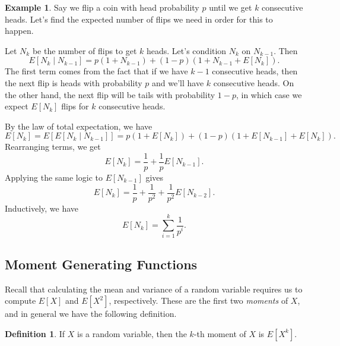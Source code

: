 \documentclass[12pt]{article}
\theoremstyle{plain}
\theoremstyle{definition}
\newtheorem{definition}[theorem]{Definition}
\newtheorem{example}[theorem]{Example}
\theoremstyle{remark}
\begin{document}
\begin{example}
    Say we flip a coin with head probability $p$ until we get $k$ consecutive heads.
    Let's find the expected number of flips we need in order for this to happen.

    Let $N_k$ be the number of flips to get $k$ heads.
    Let's condition $N_k$ on $N_{k-1}$.
    Then
    \[
        E[N_k \mid N_{k-1}] = p(1+N_{k-1}) + (1-p)(1 + N_{k-1} + E[N_k]).
    \]
    The first term comes from the fact that if we have $k-1$ consecutive heads, then the next flip is heads with probability $p$ and we'll have $k$ consecutive heads.
    On the other hand, the next flip will be tails with probability $1-p$, in which case we expect $E[N_k]$ flips for $k$ consecutive heads.

    By the law of total expectation, we have
    \[
        E[N_k] = E[E[N_k\mid N_{k-1}]] = p(1 + E[N_k]) + (1-p)(1 + E[N_{k-1}] + E[N_k]).
    \]
    Rearranging terms, we get
    \[
        E[N_k] = \frac{1}{p} + \frac{1}{p}E[N_{k-1}].
    \]
    Applying the same logic to $E[N_{k-1}]$ gives
    \[
        E[N_k] = \frac{1}{p} + \frac{1}{p^2} + \frac{1}{p^2}E[N_{k-2}].
    \]
    Inductively, we have
    \[
        E[N_k] = \sum_{i=1}^k\frac{1}{p^i}.
    \]
\end{example}










\subsection{Moment Generating Functions}
Recall that calculating the mean and variance of a random variable requires us to compute $E[X]$ and $E[X^2]$, respectively.
These are the first two \emph{moments} of $X$, and in general we have the following definition.
\begin{definition}
    If $X$ is a random variable, then the $k$-th moment of $X$ is $E[X^k]$.
\end{definition}
\end{document}
